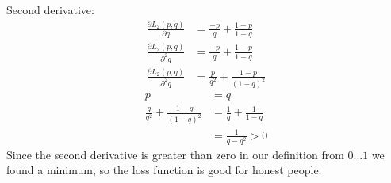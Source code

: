Second derivative:
\begin{align*}
\frac{\partial L_2\left(p, q\right)}{\partial q} &= \frac{-p}{q} + \frac{1-p}{1-q} \\
\frac{\partial L_2\left(p, q\right)}{\partial^2 q} &= \frac{-p}{q} + \frac{1-p}{1-q} \\
\frac{\partial L_2\left(p, q\right)}{\partial^2 q} &= \frac{p}{q^2} + \frac{1-p}{\left(1-q\right)^2}
\end{align*}
\begin{align*}
p &= q\\
\frac{q}{q^2} + \frac{1-q}{\left(1-q\right)^2} &= \frac{1}{q} + \frac{1}{1-q} \\
&= \frac{1}{q-q^2} > 0
\end{align*}
Since the second derivative is greater than zero in our definition from $0...1$ we found a minimum, so the loss function is good for honest people.


